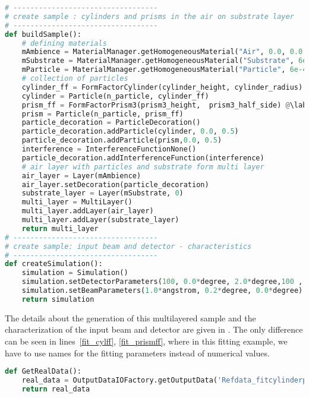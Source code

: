 
\begin{lstlisting}[language=python, style=eclipseboxed, name=exfit,nolol]
# ----------------------------------
# create sample : cylinders and prisms in the air on substrate layer
# ----------------------------------
def buildSample(): 
    # defining materials
    mAmbience = MaterialManager.getHomogeneousMaterial("Air", 0.0, 0.0 )
    mSubstrate = MaterialManager.getHomogeneousMaterial("Substrate", 6e-6, 2e-8 )
    mParticle = MaterialManager.getHomogeneousMaterial("Particle", 6e-4, 2e-8 )
    # collection of particles
    cylinder_ff = FormFactorCylinder(cylinder_height, cylinder_radius) @\label{fit_cylff}@
    cylinder = Particle(n_particle, cylinder_ff)
    prism_ff = FormFactorPrism3(prism3_height,  prism3_half_side) @\label{fit_prismff}@
    prism = Particle(n_particle, prism_ff)
    particle_decoration = ParticleDecoration()
    particle_decoration.addParticle(cylinder, 0.0, 0.5)
    particle_decoration.addParticle(prism,0.0, 0.5)  
    interference = InterferenceFunctionNone()
    particle_decoration.addInterferenceFunction(interference)
    # air layer with particles and substrate form multi layer
    air_layer = Layer(mAmbience)
    air_layer.setDecoration(particle_decoration)
    substrate_layer = Layer(mSubstrate, 0)
    multi_layer = MultiLayer()
    multi_layer.addLayer(air_layer)
    multi_layer.addLayer(substrate_layer)
    return multi_layer
# ----------------------------------
# create sample: input beam and detector - characteristics
# ----------------------------------
def createSimulation():
    simulation = Simulation()
    simulation.setDetectorParameters(100, 0.0*degree, 2.0*degree,100 , 0.0*degree, 2.0*degree)
    simulation.setBeamParameters(1.0*angstrom, 0.2*degree, 0.0*degree)
    return simulation
\end{lstlisting}

The details about the generation of this multilayered sample and the
characterization of the input beam and detector are given in .
The only difference can be seen in lines~\ref{fit_cylff},
\ref{fit_prismff}, where in this fitting example, we have to use names
for the fitting parameters instead of numerical values.


\begin{lstlisting}[language=python, style=eclipseboxed, name=exfit,nolol]
def GetRealData(): 
    real_data = OutputDataIOFactory.getOutputData('Refdata_fitcylinderprisms.txt') @\label{fit_input_realdata}@
    return real_data
\end{lstlisting}

